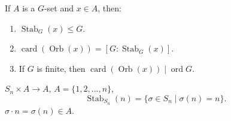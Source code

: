 \bigskip
\noindent{} If $A$ is a $G$-set and $x\in A$, then:
\begin{enumerate}
\item[(1)] $\operatorname{Stab}_G(x)\leq G$.
\item[(2)] $\operatorname{card}(\operatorname{Orb}(x))
=[G:\operatorname{Stab}_G(x)]$.
\item[(3)] If $G$ is finite, then
$\operatorname{card}(\operatorname{Orb}(x))\mid\operatorname{ord}G$.
\end{enumerate}

\bigskip
\noindent $S_n\times A\longrightarrow A$, \qquad $A=\{1,2,\ldots,n\}$,
\[
\operatorname{Stab}_{S_n}(n)
=\{\sigma\in S_n\mid\sigma(n)=n\}.
\]
\noindent $\sigma\cdot n=\sigma(n)\in A$.
